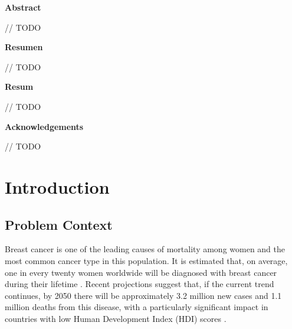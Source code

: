 \documentclass[a4paper,10pt]{book}
\begin{document}
\newpage
{}
\noindent \textbf{\large Abstract}

// TODO


\newpage
{}
\noindent \textbf{\large Resumen}

// TODO


\newpage
{}
\noindent \textbf{\large Resum}

// TODO

\newpage
{}
\noindent \textbf{\large Acknowledgements}

// TODO
 \setcounter{page}{0}
\let\cleardoublepage\clearpage
\tableofcontents
\newpage \thispagestyle{empty}

\listoffigures
\listoftables


\pagestyle{fancy}
\newpage \thispagestyle{empty}
\mainmatter
\chapter{Introduction}
\section{Problem Context}

Breast cancer is one of the leading causes of mortality among women and the most common cancer type in this population. It is estimated that, on average, one in every twenty women worldwide will be diagnosed with breast cancer during their lifetime \cite{kim_global_2025}. Recent projections suggest that, if the current trend continues, by 2050 there will be approximately 3.2 million new cases and 1.1 million deaths from this disease, with a particularly significant impact in countries with low Human Development Index (HDI) scores \cite{kim_global_2025}.
\end{document}
